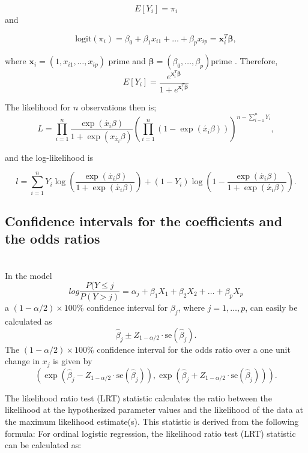 \documentclass[12pt]{article}
\numberwithin{equation}{section}
\begin{document}
\begin{equation}
E[Y_i] = \pi_i 
\label{eq:3.7}
	\end{equation}
and

\begin{equation}
\text{logit}(\pi_i) = \beta_0 + \beta_1 x_{i1} + \ldots + \beta_p x_{ip}
 = \mathbf{x}_i^T \boldsymbol{\beta}, 
 \label{eq:3.8}
	\end{equation}
 
where \( \mathbf{x}_i = (1, x_{i1}, \ldots, x_{ip}) \) prime 
 and 
 \( \boldsymbol{\beta} = (\beta_0, \ldots, \beta_p) \)prime . 
 Therefore,
\[ E[Y_i] = \frac{{e^{\mathbf{x}_i^T \boldsymbol{\beta}}}}{{1 + e^{\mathbf{x}_i^T \boldsymbol{\beta}}}} \]


The likelihood for \(n\) observations then is;
\begin{equation}
L = \prod_{i=1}^{n} \frac{\exp(\acute{x_i}\beta)}{1 + \exp(x_\acute{x_i}\beta)} \left(\prod_{i=1}^{n} (1 - \exp(\acute{x_i}\beta))\right)^{n-\sum_{i=1}^{n} Y_i},
 \label{eq:3.9}
	\end{equation}
	
and the log-likelihood is


\begin{equation}
l = \sum_{i=1}^{n} Y_i \log\left(\frac{\exp(\acute{x_i}\beta)}{1 + \exp(\acute{x_i}\beta)}\right) + (1 - Y_i) \log\left(1 - \frac{\exp(\acute{x_i}\beta)}{1 + \exp(\acute{x_i}\beta)}\right).
 \label{eq:3.9}
	\end{equation}

\subsection{Confidence intervals for the coefficients and the odds ratios}\\
In the model
\[
	log \frac{P(Y\le j}{P(Y>j)} = \alpha_j + \beta_1 X_1 + \beta_2 X_2 + \ldots + \beta_p X_p
\]
a \((1 - \alpha/2) \times 100\%\) confidence interval for \(\beta_j\), where \(j = 1, \ldots, p\), can easily be calculated as
\[
\hat{\beta}_j \pm Z_{1-\alpha/2} \cdot \text{se}(\hat{\beta}_j).
\]
The \((1 - \alpha/2) \times 100\%\) confidence interval for the odds ratio over a one unit change in \(x_j\) is given by
\[
\left( \exp(\hat{\beta}_j - Z_{1-\alpha/2} \cdot \text{se}(\hat{\beta}_j)), \exp(\hat{\beta}_j + Z_{1-\alpha/2} \cdot \text{se}(\hat{\beta}_j)) \right).
\]


The likelihood ratio test (LRT) statistic calculates the ratio between the likelihood at the hypothesized parameter values and the likelihood of the data at the maximum likelihood estimate(s). This statistic is derived from the following formula:
For ordinal logistic regression, the likelihood ratio test (LRT) statistic can be calculated as:
\end{document}
